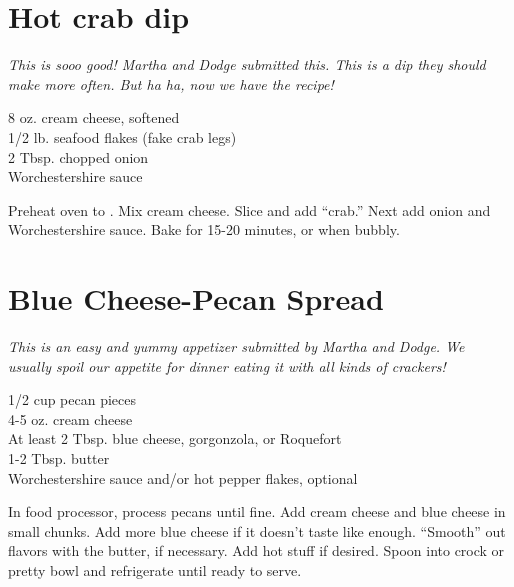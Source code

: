 \section{Hot crab dip}

\textit{This is sooo good! Martha and Dodge submitted this. This is a dip they
should make more often. But ha ha, now we have the recipe!}
\begin{ingredients}
8 oz. cream cheese, softened\\
1/2 lb. seafood flakes (fake crab legs)\\
2 Tbsp. chopped onion\\
Worchestershire sauce
\end{ingredients}
Preheat oven to . Mix cream cheese. Slice and add ``crab.'' Next add
onion and Worchestershire sauce. Bake for 15-20 minutes, or when bubbly.

\section{Blue Cheese-Pecan Spread}

\textit{This is an easy and yummy appetizer submitted by Martha and Dodge.
We usually spoil our appetite for dinner
eating it with all kinds of crackers!}
\begin{ingredients}
1/2 cup pecan pieces\\
4-5 oz. cream cheese\\
At least 2 Tbsp.  blue cheese, gorgonzola, or Roquefort\\
1-2 Tbsp.  butter \\
Worchestershire sauce and/or hot pepper flakes, optional
\end{ingredients}
In food processor, process pecans until fine. Add cream cheese and blue cheese
in small chunks. Add more blue cheese if it doesn't taste like enough.
``Smooth'' out flavors with the butter, if necessary. Add hot stuff if desired.
Spoon into crock or pretty bowl and refrigerate until ready to serve. 
